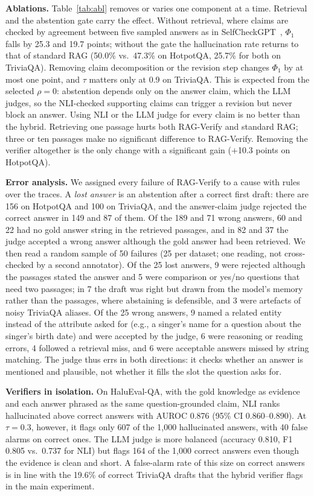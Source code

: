 \documentclass[conference]{IEEEtran}
\begin{document}
\textbf{Ablations.} Table~\ref{tab:abl} removes or varies one component at a time. Retrieval and the abstention gate carry the effect. Without retrieval, where claims are checked by agreement between five sampled answers as in SelfCheckGPT~\cite{manakul2023selfcheckgpt}, $\Phi_1$ falls by 25.3 and 19.7 points; without the gate the hallucination rate returns to that of standard RAG (50.0\% vs.\ 47.3\% on HotpotQA, 25.7\% for both on TriviaQA). Removing claim decomposition or the revision step changes $\Phi_1$ by at most one point, and $\tau$ matters only at 0.9 on TriviaQA. This is expected from the selected $\rho=0$: abstention depends only on the answer claim, which the LLM judges, so the NLI-checked supporting claims can trigger a revision but never block an answer. Using NLI or the LLM judge for every claim is no better than the hybrid. Retrieving one passage hurts both RAG-Verify and standard RAG; three or ten passages make no significant difference to RAG-Verify. Removing the verifier altogether is the only change with a significant gain ($+$10.3 points on HotpotQA).

\textbf{Error analysis.} We assigned every failure of RAG-Verify to a cause with rules over the traces. A \emph{lost answer} is an abstention after a correct first draft: there are 156 on HotpotQA and 100 on TriviaQA, and the answer-claim judge rejected the correct answer in 149 and 87 of them. Of the 189 and 71 wrong answers, 60 and 22 had no gold answer string in the retrieved passages, and in 82 and 37 the judge accepted a wrong answer although the gold answer had been retrieved. We then read a random sample of 50 failures (25 per dataset; one reading, not cross-checked by a second annotator). Of the 25 lost answers, 9 were rejected although the passages stated the answer and 5 were comparison or yes/no questions that need two passages; in 7 the draft was right but drawn from the model's memory rather than the passages, where abstaining is defensible, and 3 were artefacts of noisy TriviaQA aliases. Of the 25 wrong answers, 9 named a related entity instead of the attribute asked for (e.g., a singer's name for a question about the singer's birth date) and were accepted by the judge, 6 were reasoning or reading errors, 4 followed a retrieval miss, and 6 were acceptable answers missed by string matching. The judge thus errs in both directions: it checks whether an answer is mentioned and plausible, not whether it fills the slot the question asks for.

\textbf{Verifiers in isolation.} On HaluEval-QA, with the gold knowledge as evidence and each answer phrased as the same question-grounded claim, NLI ranks hallucinated above correct answers with AUROC 0.876 (95\% CI 0.860--0.890). At $\tau=0.3$, however, it flags only 607 of the 1{,}000 hallucinated answers, with 40 false alarms on correct ones. The LLM judge is more balanced (accuracy 0.810, F1 0.805 vs.\ 0.737 for NLI) but flags 164 of the 1{,}000 correct answers even though the evidence is clean and short. A false-alarm rate of this size on correct answers is in line with the 19.6\% of correct TriviaQA drafts that the hybrid verifier flags in the main experiment.
\end{document}
